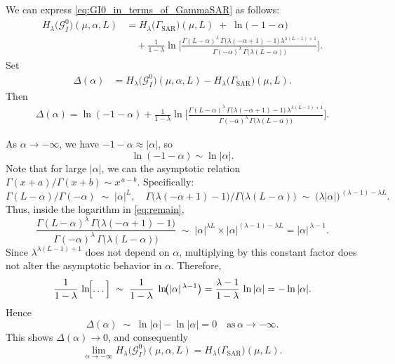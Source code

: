 \documentclass[
  letterpaper,
  11pt,
  english,
  doublespacing,
  headsepline,
  consistentlayout,
  oneside,
  openany]{MastersDoctoralThesis}
\begin{document}
We can express \eqref{eq:GI0_in_terms_of_GammaSAR} as follows:
\begin{align*}
H_\lambda\bigl(\mathcal{G}^0_I\bigr)(\mu,\alpha,L)
&=
H_\lambda\bigl(\Gamma_{\mathrm{SAR}}\bigr)(\mu,L)
\;+\;
\ln\!\bigl(-1-\alpha\bigr)
\\
&\quad
+ \frac{1}{1-\lambda}
\ln \Biggl[
  \frac{
    \Gamma(L-\alpha)^{\lambda}\,\Gamma\bigl(\lambda(-\alpha+1)-1\bigr)\,\lambda^{\lambda(L-1)+1}
  }{
    \Gamma(-\alpha)^{\lambda}\,\Gamma\bigl(\lambda(L-\alpha)\bigr)
  }
\Biggr].
\end{align*} Set \begin{align*}
\Delta(\alpha)
&=
H_\lambda\bigl(\mathcal{G}^0_I\bigr)(\mu,\alpha,L)
-
H_\lambda\bigl(\Gamma_{\mathrm{SAR}}\bigr)(\mu,L).
\end{align*} Then \begin{align}
\Delta(\alpha)
=
\ln(-1-\alpha)
+
\frac{1}{1-\lambda}
\ln \biggl[
  \frac{
    \Gamma(L-\alpha)^{\lambda}\,\Gamma\bigl(\lambda(-\alpha+1)-1\bigr)\,\lambda^{\lambda(L-1)+1}
  }{
    \Gamma(-\alpha)^{\lambda}\,\Gamma\bigl(\lambda(L-\alpha)\bigr)
  }
\biggr].
\label{eq:remain}
\end{align}

As \(\alpha \to -\infty\), we have \(-1-\alpha \approx |\alpha|\), so \[
\ln(-1-\alpha) 
\sim 
\ln|\alpha|.
\] Note that for large \(|\alpha|\), we can the asymptotic relation
\(\Gamma(x+a)/\Gamma(x+b)\sim x^{\,a-b}\). Specifically: \[
\Gamma(L-\alpha)/\Gamma(-\alpha) \;\sim\; |\alpha|^L,
\quad
\Gamma\bigl(\lambda(-\alpha+1)-1\bigr)/\Gamma\bigl(\lambda(L-\alpha)\bigr)
\;\sim\; 
\bigl(\lambda|\alpha|\bigr)^{\,(\lambda-1)-\lambda L}.
\] Thus, inside the logarithm in \eqref{eq:remain}, \[
\frac{
  \Gamma(L-\alpha)^{\lambda}\,\Gamma\bigl(\lambda(-\alpha+1)-1\bigr)
}{
  \Gamma(-\alpha)^{\lambda}\,\Gamma\bigl(\lambda(L-\alpha)\bigr)
}
\;\sim\;
|\alpha|^{\lambda L}
\times
|\alpha|^{(\lambda-1)-\lambda L}
=
|\alpha|^{\,\lambda-1}.
\] Since \(\lambda^{\lambda(L-1)+1}\) does not depend on \(\alpha\),
multiplying by this constant factor does not alter the asymptotic
behavior in \(\alpha\). Therefore, \[
\frac{1}{1-\lambda}\,
\ln\!\Bigl[\dots\Bigr]
\;\sim\;
\frac{1}{1-\lambda}\;\ln\!\bigl(|\alpha|^{\,\lambda-1}\bigr)
=
\frac{\lambda-1}{1-\lambda}\,\ln|\alpha|
=
-\ln|\alpha|.
\] Hence \[
\Delta(\alpha)
\;\sim\;
\ln|\alpha|
-
\ln|\alpha|
=
0
\quad
\text{as}\, \alpha\to -\infty.
\] This shows \(\Delta(\alpha)\to 0\), and consequently \[
\lim_{\alpha \to -\infty}
H_\lambda\bigl(\mathcal{G}^0_I\bigr)(\mu,\alpha,L)
=
H_\lambda\bigl(\Gamma_{\mathrm{SAR}}\bigr)(\mu,L).
\]
\end{document}
